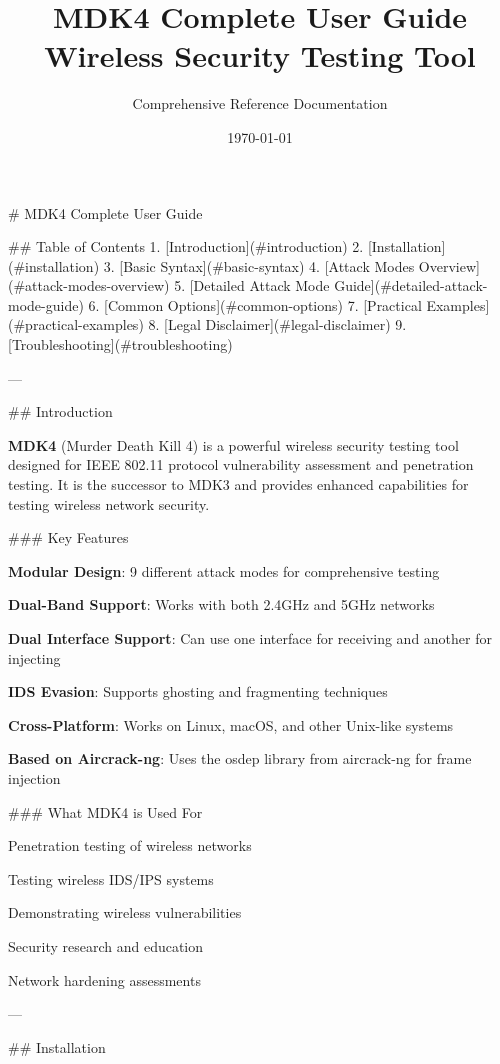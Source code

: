 \documentclass[11pt,a4paper]{article}
\title{\Huge\textbf{MDK4 Complete User Guide}\\
\Large Wireless Security Testing Tool}
\author{Comprehensive Reference Documentation}
\date{\today}
\begin{document}
\maketitle
\newpage

\tableofcontents
\newpage

\# MDK4 Complete User Guide

\#\# Table of Contents
1. [Introduction](\#introduction)
2. [Installation](\#installation)
3. [Basic Syntax](\#basic-syntax)
4. [Attack Modes Overview](\#attack-modes-overview)
5. [Detailed Attack Mode Guide](\#detailed-attack-mode-guide)
6. [Common Options](\#common-options)
7. [Practical Examples](\#practical-examples)
8. [Legal Disclaimer](\#legal-disclaimer)
9. [Troubleshooting](\#troubleshooting)

---

\#\# Introduction

\textbf{MDK4} (Murder Death Kill 4) is a powerful wireless security testing tool designed for IEEE 802.11 protocol vulnerability assessment and penetration testing. It is the successor to MDK3 and provides enhanced capabilities for testing wireless network security.

\#\#\# Key Features
\item \textbf{Modular Design}: 9 different attack modes for comprehensive testing
\item \textbf{Dual-Band Support}: Works with both 2.4GHz and 5GHz networks
\item \textbf{Dual Interface Support}: Can use one interface for receiving and another for injecting
\item \textbf{IDS Evasion}: Supports ghosting and fragmenting techniques
\item \textbf{Cross-Platform}: Works on Linux, macOS, and other Unix-like systems
\item \textbf{Based on Aircrack-ng}: Uses the osdep library from aircrack-ng for frame injection

\#\#\# What MDK4 is Used For
\item Penetration testing of wireless networks
\item Testing wireless IDS/IPS systems
\item Demonstrating wireless vulnerabilities
\item Security research and education
\item Network hardening assessments

---

\#\# Installation
\end{document}
